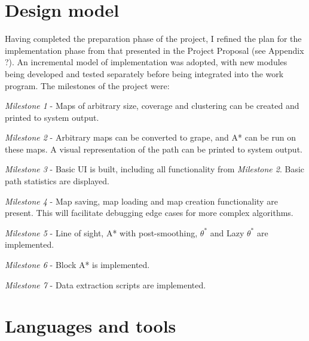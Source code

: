 \documentclass[12pt,notitlepage]{report}
\begin{document}

\section {Design model}

\noindent
Having completed the preparation phase of the project, I refined the plan for the implementation phase from that presented in the Project Proposal (see Appendix ?). An incremental model of implementation was adopted, with new modules being developed and tested separately before being integrated into the work program. The milestones of the project were:
\begin{description}
\item {\em Milestone 1} - Maps of arbitrary size, coverage and clustering can be created and printed to system output.
\item {\em Milestone 2} - Arbitrary maps can be converted to grape, and A* can be run on these maps. A visual representation of the path can be printed to system output.
\item {\em Milestone 3} - Basic UI is built, including all functionality from {\em Milestone 2}. Basic path statistics are displayed.
\item {\em Milestone 4} - Map saving, map loading and map creation functionality are present. This will facilitate debugging edge cases for more complex algorithms.
\item {\em Milestone 5} - Line of sight, A* with post-smoothing, $\theta ^{*}$ and Lazy $\theta ^{*}$ are implemented.
\item {\em Milestone 6} - Block A* is implemented.
\item {\em Milestone 7} - Data extraction scripts are implemented.
\end{description}

\section {Languages and tools}
\end{document}
